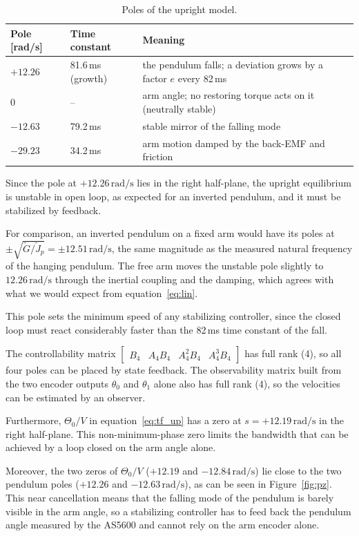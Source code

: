 \documentclass[a4paper,11pt]{article}
\begin{document}
\begin{table}[h]
\centering
\caption{Poles of the upright model.}
\label{tab:poles_up}
\small
\begin{tabular}{@{}lll@{}}
\toprule
Pole [rad/s] & Time constant & Meaning \\
\midrule
$+12.26$ & 81.6\,ms (growth) & the pendulum falls; a deviation grows by a factor $e$ every 82\,ms \\
$0$ & -- & arm angle; no restoring torque acts on it (neutrally stable) \\
$-12.63$ & 79.2\,ms & stable mirror of the falling mode \\
$-29.23$ & 34.2\,ms & arm motion damped by the back-EMF and friction \\
\bottomrule
\end{tabular}
\end{table}

Since the pole at \textbf{\boldmath$+12.26\,\mathrm{rad/s}$} lies in the right half-plane, the upright equilibrium is unstable in open loop, as expected for an inverted pendulum, and it must be stabilized by feedback.

For comparison, an inverted pendulum on a fixed arm would have its poles at $\pm\sqrt{\tilde G/\tilde J_p} = \pm 12.51\,\mathrm{rad/s}$, the same magnitude as the measured natural frequency of the hanging pendulum. The free arm moves the unstable pole slightly to $12.26\,\mathrm{rad/s}$ through the inertial coupling and the damping, which agrees with what we would expect from equation~\ref{eq:lin}.

This pole sets the minimum speed of any stabilizing controller, since the closed loop must react considerably faster than the 82\,ms time constant of the fall.

The controllability matrix $\begin{bmatrix} B_4 & A_4 B_4 & A_4^2 B_4 & A_4^3 B_4 \end{bmatrix}$ has full rank (4), so all four poles can be placed by state feedback. The observability matrix built from the two encoder outputs $\theta_0$ and $\theta_1$ alone also has full rank (4), so the velocities can be estimated by an observer.

Furthermore, $\Theta_0/V$ in equation~\ref{eq:tf_up} has a zero at $s = +12.19\,\mathrm{rad/s}$ in the right half-plane. This non-minimum-phase zero limits the bandwidth that can be achieved by a loop closed on the arm angle alone.

Moreover, the two zeros of $\Theta_0/V$ ($+12.19$ and $-12.84\,\mathrm{rad/s}$) lie close to the two pendulum poles ($+12.26$ and $-12.63\,\mathrm{rad/s}$), as can be seen in Figure~\ref{fig:pz}. This near cancellation means that the falling mode of the pendulum is barely visible in the arm angle, so a stabilizing controller has to feed back the pendulum angle measured by the AS5600 and cannot rely on the arm encoder alone.
\end{document}
